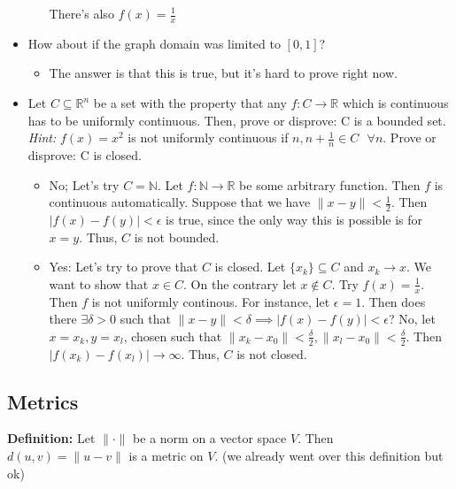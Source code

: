 \documentclass{article}
\newcommand*{\txt}[1]{\text{ #1 }}%
\newcommand*{\fora}{\txt{}\forall}%
\newcommand*{\rr}{\mathbb{R}}%
\begin{document}
\begin{itemize}
\begin{itemize}
        There's also $f(x)=\frac{1}{x}$
    \end{itemize}
    \item How about if the graph domain was limited to $[0,1]$?
    \begin{itemize}
        \item The answer is that this is true, but it's hard to prove right now.
    \end{itemize}
    \item Let $C\subseteq\rr^n$ be a set with the property that any $f:C\to \rr$ which is continuous has to be uniformly continuous. Then, prove or disprove: C is a bounded set. \textit{Hint:} $f(x)=x^2$ is not uniformly continuous if $n, n+\frac{1}{n}\in C\fora n$. Prove or disprove: C is closed.
    \begin{itemize}
        \item No; Let's try $C=\mathbb{N}$. Let $f:\mathbb{N}\to\rr$ be some arbitrary function. Then $f$ is continuous automatically. Suppose that we have $\|x-y\|<\frac{1}{2}$. Then $|f(x)-f(y)|<\epsilon$ is true, since the only way this is possible is for $x=y$. Thus, $C$ is not bounded.
        \item Yes: Let's try to prove that $C$ is closed. Let $\{x_k\}\subseteq C$ and $x_k\to x$. We want to show that $x\in C$. On the contrary let $x\notin C$. Try $f(x)=\frac{1}{x}$. Then $f$ is not uniformly continous. For instance, let $\epsilon=1$. Then does there $\exists \delta>0$ such that $\|x-y\|<\delta\implies |f(x)-f(y)|<\epsilon$? No, let $x=x_k,y=x_l$, chosen such that $\|x_k-x_0\|<\frac{\delta}{2},\|x_l-x_0\|<\frac{\delta}{2}$. Then $|f(x_k)-f(x_l)|\to \infty$. Thus, $C$ is not closed.
    \end{itemize}
\end{itemize}

\subsection{Metrics}

\textbf{Definition:} Let $\|\cdot\|$ be a norm on a vector space $V$. Then $d(u,v)=\|u-v\|$ is a metric on $V$. (we already went over this definition but ok)
\end{document}

